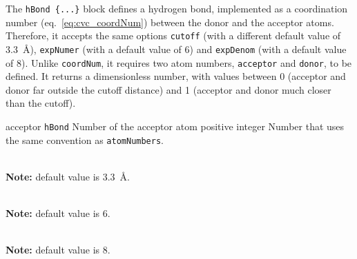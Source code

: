 
The \texttt{hBond \{...\}} block defines a hydrogen
bond, implemented as a coordination number (eq.~\ref{eq:cvc_coordNum})
between the donor and the acceptor atoms.  Therefore, it accepts the
same options \texttt{cutoff} (with a different default value of
3.3~\AA{}), \texttt{expNumer} (with a default value of 6) and
\texttt{expDenom} (with a default value of 8).  Unlike
\texttt{coordNum}, it requires two atom numbers, \texttt{acceptor} and
\texttt{donor}, to be defined.  It returns a dimensionless number,
with values between 0 (acceptor and donor far outside the cutoff
distance) and 1 (acceptor and donor much closer than the cutoff).

\begin{cvcoptions}
\item %
  \key
    {acceptor}{%
    \texttt{hBond}}{%
    Number of the acceptor atom}{%
    positive integer}{%
    Number that uses the same convention as \texttt{atomNumbers}.}
\item %
\item %
  \\
  \textbf{Note:} default value is 3.3~\AA.
\item %
  \\
  \textbf{Note:} default value is 6.
\item %
  \\
  \textbf{Note:} default value is 8.
\end{cvcoptions}






